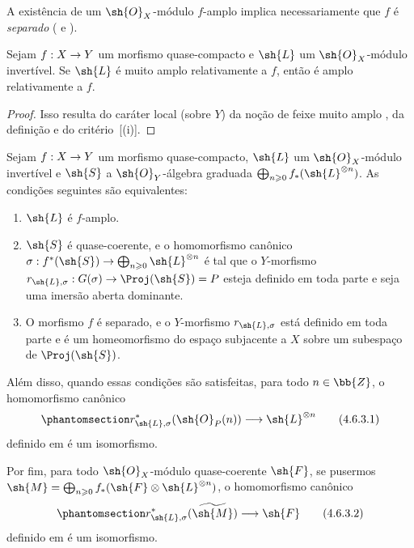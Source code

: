 \documentclass[oneside,10pt]{amsart}
\makeatletter
\renewcommand{\geq}{\geqslant}
\newcommand{\ega@arrow}[2]{\mathchoice{#1}{#2}{#2}{#2}}
\renewcommand{\to}{\ega@arrow{\longrightarrow}{\rightarrow}}
\let\EGAOriginalLabel\label
\renewcommand{\label}[1]{\phantomsection\EGAOriginalLabel{#1}}
\makeatother
\begin{document}
A existência de um $\sh{O}_X$-módulo $f$-amplo implica necessariamente que $f$ é \emph{separado} ( e ).

\begin{proposition}[4.6.2]
\label{II.4.6.2}
Sejam $f:X\to Y$ um morfismo quase-compacto e $\sh{L}$ um $\sh{O}_X$-módulo invertível.
Se $\sh{L}$ é muito amplo relativamente a $f$, então é amplo relativamente a $f$.
\end{proposition}

\begin{proof}
Isso resulta do caráter local (sobre $Y$) da noção de feixe muito amplo , da definição  e do critério~[(i)].
\end{proof}

\begin{proposition}[4.6.3]
\label{II.4.6.3}
Sejam $f:X\to Y$ um morfismo quase-compacto, $\sh{L}$ um $\sh{O}_X$-módulo invertível e $\sh{S}$ a $\sh{O}_Y$-álgebra graduada $\bigoplus_{n\geq0}f_*(\sh{L}^{\otimes n})$.
As condições seguintes são equivalentes:
\begin{enumerate}
  \item[\rm{(a)}] $\sh{L}$ é $f$-amplo.
  \item[\rm{(b)}] $\sh{S}$ é quase-coerente, e o homomorfismo canônico $\sigma:f^*(\sh{S})\to\bigoplus_{n\geq0}\sh{L}^{\otimes n}$  é tal que o $Y$-morfismo $r_{\sh{L},\sigma}:G(\sigma)\to\Proj(\sh{S})=P$ esteja definido em toda parte e seja uma imersão aberta dominante.
  \item[\rm{(b')}] O morfismo $f$ é separado, e o $Y$-morfismo $r_{\sh{L},\sigma}$ está definido em toda parte e é um homeomorfismo do espaço subjacente a $X$ sobre um subespaço de $\Proj(\sh{S})$.
\end{enumerate}

Além disso, quando essas condições são satisfeitas, para todo $n\in\bb{Z}$, o homomorfismo canônico
\[
\label{II.4.6.3.1}
  r_{\sh{L},\sigma}^*(\sh{O}_P(n))\to\sh{L}^{\otimes n}
\tag{4.6.3.1}
\]
definido em  é um isomorfismo.

Por fim, para todo $\sh{O}_X$-módulo quase-coerente $\sh{F}$, se pusermos $\sh{M}=\bigoplus_{n\geq0}f_*(\sh{F}\otimes\sh{L}^{\otimes n})$, o homomorfismo canônico
\[
\label{II.4.6.3.2}
  r_{\sh{L},\sigma}^*(\widetilde{\sh{M}})\to\sh{F}
\tag{4.6.3.2}
\]
definido em  é um isomorfismo.
\end{proposition}
\end{document}
